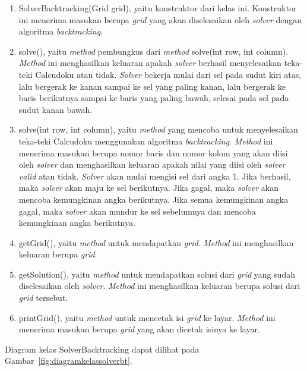 \begin{enumerate}
\item SolverBacktracking(Grid grid), yaitu konstruktor dari kelas ini. Konstruktor ini menerima masukan berupa \textit{grid} yang akan diselesaikan oleh \textit{solver} dengan algoritma \textit{backtracking}.
\item solve(), yaitu \textit{method} pembungkus dari \textit{method} solve(int row, int column). \textit{Method} ini menghasilkan keluaran apakah \textit{solver} berhasil menyelesaikan teka-teki Calcudoku atau tidak. \textit{Solver} bekerja mulai dari sel pada sudut kiri atas, lalu bergerak ke kanan sampai ke sel yang paling kanan, lalu bergerak ke baris berikutnya sampai ke baris yang paling bawah, selesai pada sel pada sudut kanan bawah.
\item solve(int row, int column), yaitu \textit{method} yang mencoba untuk menyelesaikan teka-teki Calcudoku menggunakan algoritma \textit{backtracking}. \textit{Method} ini menerima masukan berupa nomor baris dan nomor kolom yang akan diisi oleh \textit{solver} dan menghasilkan keluaran apakah nilai yang diisi oleh \textit{solver valid} atau tidak. \textit{Solver} akan mulai mengisi sel dari angka 1. Jika berhasil, maka \textit{solver} akan maju ke sel berikutnya. Jika gagal, maka \textit{solver} akan mencoba kemungkinan angka berikutnya. Jika semua kemungkinan angka gagal, maka \textit{solver} akan mundur ke sel sebelumnya dan mencoba kemungkinan angka berikutnya.
\item getGrid(), yaitu \textit{method} untuk mendapatkan \textit{grid}. \textit{Method} ini menghasilkan keluaran berupa \textit{grid}.
\item getSolution(), yaitu \textit{method} untuk mendapatkan solusi dari \textit{grid} yang sudah diselesaikan oleh \textit{solver}. \textit{Method} ini menghasilkan keluaran berupa solusi dari \textit{grid} tersebut.
\item printGrid(), yaitu \textit{method} untuk mencetak isi \textit{grid} ke layar. \textit{Method} ini menerima masukan berupa \textit{grid} yang akan dicetak isinya ke layar.
\end{enumerate}

Diagram kelas SolverBacktracking dapat dilihat pada Gambar~\ref{fig:diagramkelassolverbt}.

